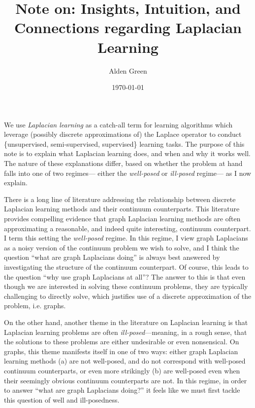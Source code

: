 \documentclass{article}
\newcommand{\1}{\mathbf{1}}
\theoremstyle{definition}
\theoremstyle{remark}
\begin{document}
\title{Note on: Insights, Intuition, and Connections regarding Laplacian Learning}
\author{Alden Green}
\date{\today}
\maketitle

We use \emph{Laplacian learning} as a catch-all term for learning algorithms which leverage (possibly discrete approximations of) the Laplace operator to conduct \{unsupervised, semi-supervised, supervised\} learning tasks. The purpose of this note is to explain what Laplacian learning does, and when and why it works well. The nature of these explanations differ, based on whether the problem at hand falls into one of two regimes--- either the \emph{well-posed} or \emph{ill-posed} regime--- as I now explain.

There is a long line of literature addressing the relationship between discrete Laplacian learning methods and their continuum counterparts. This literature provides compelling evidence that graph Laplacian learning methods are often approximating a reasonable, and indeed quite interesting, continuum counterpart. I term this setting the \emph{well-posed} regime. In this regime, I view graph Laplacians as a noisy version of the continuum problem we wish to solve, and I think the question ``what are graph Laplacians doing'' is always best answered by investigating the structure of the continuum counterpart. Of course, this leads to the question ``why use graph Laplacians at all''? The answer to this is that even though we are interested in solving these continuum problems, they are typically challenging to directly solve, which justifies use of a discrete approximation of the problem, i.e. graphs.

On the other hand, another theme in the literature on Laplacian learning is that Laplacian learning problems are often \emph{ill-posed}---meaning, in a rough sense, that the solutions to these problems are either undesirable or even nonsensical. On graphs, this theme manifests itself in one of two ways: either graph Laplacian learning methods (a) are not well-posed, and do not correspond with well-posed continuum counterparts, or even more strikingly (b) are well-posed even when their seemingly obvious continuum counterparts are not. In this regime, in order to answer ``what are graph Laplacians doing?'' it feels like we must first tackle this question of well and ill-posedness. 
\end{document}
